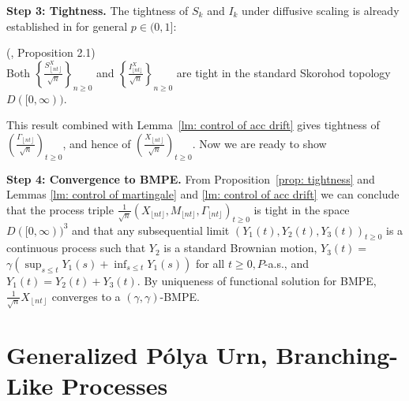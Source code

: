 \documentclass[EJP]{ejpecp} %
\begin{document}
\vspace{1em}

\textbf{Step 3: Tightness.} The tightness of $S_k$ and $I_k$ under diffusive scaling is already established in \cite{KMP23} for general $p \in (0,1]$:
\begin{proposition}
	(\cite{KMP23}, Proposition 2.1)\\
	\label{prop: tightness}
	Both $\left\{\frac{S_{\left\lfloor n t \right\rfloor}^X}{\sqrt{n}}\right\}_{n \geq 0}$ and $\left\{\frac{I_{\lfloor n t \rfloor}^X}{\sqrt{n}}\right\}_{n \geq 0}$ are tight in the standard Skorohod topology $D([0, \infty))$.
\end{proposition}
This result combined with Lemma~\ref{lm: control of acc drift} gives tightness of $\left(\frac{\Gamma_{\left\lfloor nt  \right\rfloor}}{\sqrt{n} }\right)_{t \ge 0}$, and hence of $\left(\frac{X_{\left\lfloor nt  \right\rfloor}}{\sqrt{n} }\right)_{t \ge 0}$. 
Now we are ready to show
\vspace{1em}

\textbf{Step 4: Convergence to BMPE.} 
From Proposition~\ref{prop: tightness} and Lemmas \ref{lm: control of martingale} and \ref{lm: control of acc drift} we can conclude that the process triple $\frac{1}{\sqrt{n}}\left(X_{\lfloor n t\rfloor}, M_{\lfloor n t\rfloor}, \Gamma_{\lfloor n t\rfloor}\right)_{t \geq 0}$ is tight in the space $D([0, \infty))^3$ and that any subsequential limit $\left(Y_1(t), Y_2(t), Y_3(t)\right)_{t \geq 0}$ is a continuous process such that $Y_2$ is a standard Brownian motion, $Y_3(t)=$ $\gamma\left(\sup _{s \leq t} Y_1(s)+\inf _{s \leq t} Y_1(s)\right)$ for all $t \geq 0, P$-a.s., and $Y_1(t)=Y_2(t)+Y_3(t)$. By uniqueness of functional solution for BMPE, $\frac{1}{\sqrt{n} } X_{\left\lfloor nt  \right\rfloor}$ converges to a $(\gamma, \gamma)$-BMPE.

\section{Generalized P\'{o}lya Urn, Branching-Like Processes}\label{sec: generalized Polya Urn, BLP}
\end{document}
